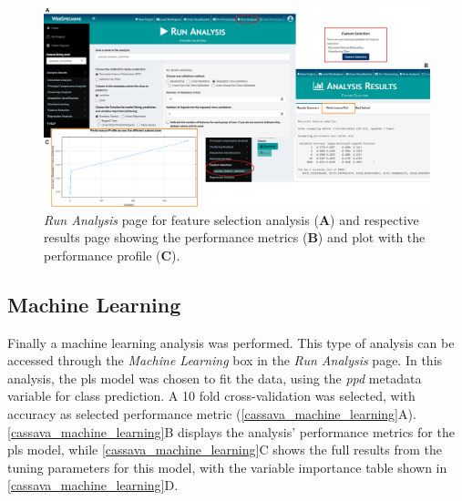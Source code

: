 \begin{figure}[H]
	\centering
	\includegraphics[width=1\linewidth]{Imagens/CassavaPPD/feature_selection}
	\caption{\textit{Run Analysis} page for feature selection analysis (\textbf{A}) and respective results page showing the performance metrics (\textbf{B}) and plot with the performance profile (\textbf{C}).}
	\label{cassava_feature_selection}
\end{figure}



\subsection{Machine Learning}

Finally a machine learning analysis was performed. This type of analysis can be accessed through the \textit{Machine Learning} box in the \textit{Run Analysis} page. In this analysis, the \gls{pls} model was chosen to fit the data, using the \textit{ppd} metadata variable for class prediction. A 10 fold cross-validation was selected, with accuracy as selected performance metric (\autoref{cassava_machine_learning}A). \autoref{cassava_machine_learning}B displays the analysis' performance metrics for the \gls{pls} model, while \autoref{cassava_machine_learning}C shows the full results from the tuning parameters for this model, with the variable importance table shown in \autoref{cassava_machine_learning}D.


